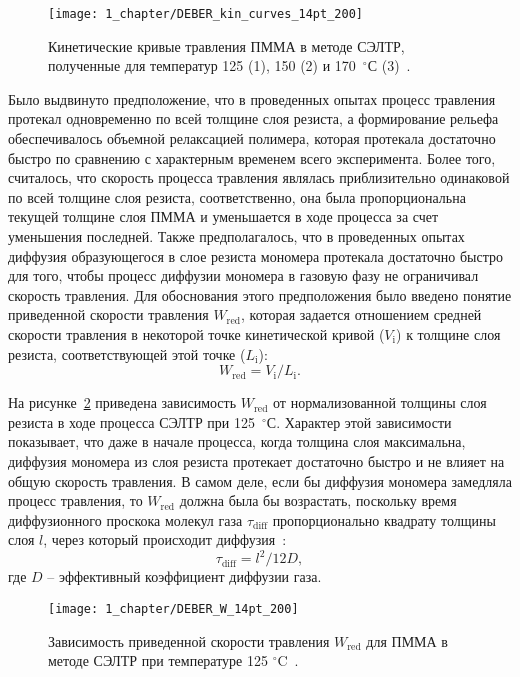 \begin{figure}[t]
	\centering
	\texttt{[image: 1\_chapter/DEBER\_kin\_curves\_14pt\_200]}
	\vspace{0.5em}
	\caption{Кинетические кривые травления ПММА в методе СЭЛТР, полученные для температур 125 (1), 150 (2) и 170~$^\circ$С (3)~\cite{Bruk_2013}.}
	\label{fig:kin_curves}
\end{figure}

Было выдвинуто предположение, что в проведенных опытах процесс травления протекал одновременно по всей толщине слоя резиста, а формирование рельефа обеспечивалось объемной релаксацией полимера, которая протекала достаточно быстро по сравнению с характерным временем всего эксперимента. Более того, считалось, что скорость процесса травления являлась приблизительно одинаковой по всей толщине слоя резиста, соответственно, она была пропорциональна текущей толщине слоя ПММА и уменьшается в ходе процесса за счет уменьшения последней. Также предполагалось, что в проведенных опытах диффузия образующегося в слое резиста мономера протекала достаточно быстро для того, чтобы процесс диффузии мономера в газовую фазу не ограничивал скорость травления. Для обоснования этого предположения было введено понятие приведенной скорости травления $W_\mathrm{red}$, которая задается отношением средней скорости травления в некоторой точке кинетической кривой ($V_\mathrm{i}$) к толщине слоя резиста, соответствующей этой точке ($L_\mathrm{i}$):
\begin{equation}
	W_\mathrm{red} = V_\mathrm{i} / L_\mathrm{i}.
\end{equation}

На рисунке~\ref{fig:DEBER_W} приведена зависимость $W_\mathrm{red}$ от нормализованной толщины слоя резиста в ходе процесса СЭЛТР при 125~$^\circ$С. Характер этой зависимости показывает, что даже в начале процесса, когда толщина слоя максимальна, диффузия мономера из слоя резиста протекает достаточно быстро и не влияет на общую скорость травления. В самом деле, если бы диффузия мономера замедляла процесс травления, то $W_\mathrm{red}$ должна была бы возрастать, поскольку время диффузионного проскока молекул газа $\tau_\mathrm{diff}$ пропорционально квадрату толщины слоя $l$, через который происходит диффузия~\cite{Bruk_2000}:
\begin{equation}
	\tau_\mathrm{diff} = l^2 / 12 D,
\end{equation}
где $D$ -- эффективный коэффициент диффузии газа.

\begin{figure}[t]
	\centering
	\texttt{[image: 1\_chapter/DEBER\_W\_14pt\_200]}
	\vspace{0.2em}
	\caption{Зависимость приведенной скорости травления $W_\mathrm{red}$ для ПММА в методе СЭЛТР при температуре 125 $^\circ$C~\cite{Bruk_2013}.}
	\label{fig:DEBER_W}
\end{figure}

